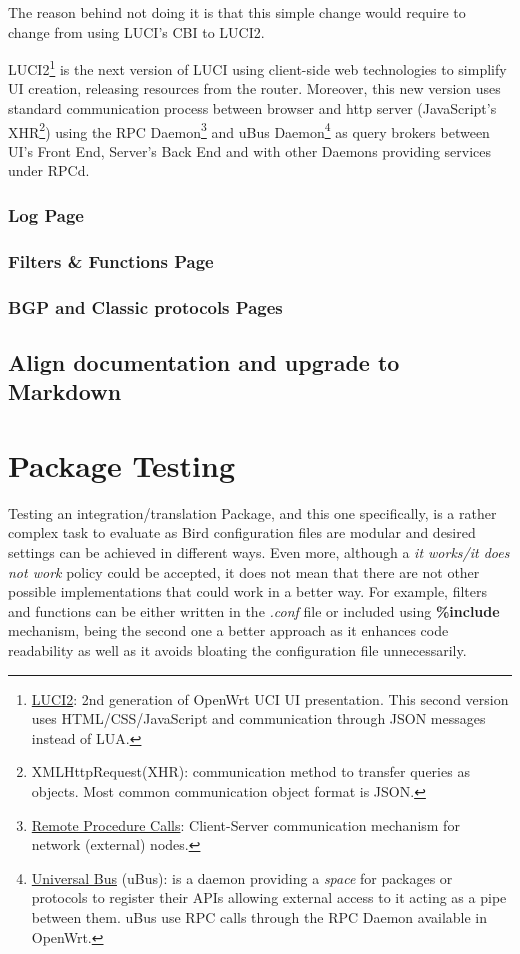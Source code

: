 The reason behind not doing it is that this simple change would require to change from using LUCI's CBI to LUCI2. 

LUCI2\footnote{\href{https://wiki.openwrt.org/doc/techref/luci2}{LUCI2}: 2nd generation of OpenWrt UCI UI presentation. This second version uses HTML/CSS/JavaScript and communication through JSON messages instead of LUA.} is the next version of LUCI using client-side web technologies to simplify UI creation, releasing resources from the router. Moreover, this new version uses standard communication process between browser and http server (JavaScript's XHR\footnote{XMLHttpRequest(XHR): communication method to transfer queries as objects. Most common communication object format is JSON.}) using the RPC Daemon\footnote{\href{https://wiki.openwrt.org/doc/techref/rpcd}{Remote Procedure Calls}: Client-Server communication mechanism for network (external) nodes.} and uBus Daemon\footnote{\href{https://wiki.openwrt.org/doc/techref/ubus}{Universal Bus} (uBus): is a daemon providing a \textit{space} for packages or protocols to register their APIs allowing external access to it acting as a pipe between them. uBus use RPC calls through the RPC Daemon available in OpenWrt.} as query brokers between UI's Front End, Server's Back End and with other Daemons providing services under RPCd.

\subsubsection{Log Page}


\subsubsection{Filters \& Functions Page}


\subsubsection{BGP and Classic protocols Pages}


\subsection{Align documentation and upgrade to Markdown}

\newpage
\section{Package Testing}
Testing an integration/translation Package, and this one specifically, is a rather complex task to evaluate as Bird configuration files are modular and desired settings can be achieved in different ways. Even more, although a \textit{it works/it does not work} policy could be accepted, it does not mean that there are not other possible implementations that could work in a better way. For example, filters and functions can be either written in the \textit{.conf} file or included using \textbf{\%include} mechanism, being the second one a better approach as it enhances code readability as well as it avoids bloating the configuration file unnecessarily.

